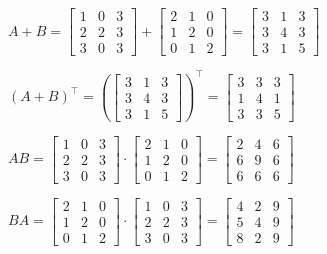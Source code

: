 \begin{enumerate}[label=\color{red}\textbf{\arabic*)}]
$A+B=\begin{bmatrix} 
    1 & 0 & 3\\
    2 & 2 & 3\\
    3 & 0 & 3
\end{bmatrix}+\begin{bmatrix} 
    2 & 1 & 0\\
    1 & 2 & 0\\
    0 & 1 & 2
\end{bmatrix}=\begin{bmatrix} 
    3 & 1 & 3\\
    3 & 4 & 3\\
    3 & 1 & 5
\end{bmatrix}   $ 

$(A+B)^\intercal=\left( \begin{bmatrix} 
        3 & 1 & 3\\
        3 & 4 & 3\\
        3 & 1 & 5
\end{bmatrix}  \right)^\intercal=\begin{bmatrix} 
        3 & 3 & 3\\
        1 & 4 & 1\\
        3 & 3 & 5
\end{bmatrix}  $

$AB=\begin{bmatrix} 
    1 & 0 & 3\\
    2 & 2 & 3\\
    3 & 0 & 3
\end{bmatrix}\cdot\begin{bmatrix} 
    2 & 1 & 0\\
    1 & 2 & 0\\
    0 & 1 & 2
\end{bmatrix}=\begin{bmatrix} 
    2 & 4 & 6\\
    6 & 9 & 6\\
    6 & 6 & 6
\end{bmatrix} $

$BA=\begin{bmatrix} 
    2 & 1 & 0\\
    1 & 2 & 0\\
    0 & 1 & 2
\end{bmatrix}\cdot \begin{bmatrix} 
    1 & 0 & 3\\
    2 & 2 & 3\\
    3 & 0 & 3
\end{bmatrix} = \begin{bmatrix} 
    4 & 2 & 9\\
    5 & 4 & 9\\
    8 & 2 & 9
\end{bmatrix} $


\end{enumerate}
